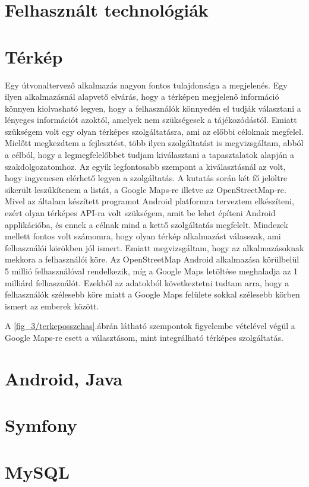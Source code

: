 	

\section{Felhasznált technológiák}
\label{felhaszntech}
\section*{Térkép}
Egy útvonaltervező alkalmazás nagyon fontos tulajdonsága a megjelenés. 
Egy ilyen alkalmazásnál alapvető elvárás, hogy a térképen megjelenő információ könnyen kiolvasható legyen, hogy a felhasználók könnyedén el tudják választani a lényeges információt azoktól, amelyek nem szükségesek a tájékozódástól. 
Emiatt szükségem volt egy olyan térképes szolgáltatásra, ami az előbbi céloknak megfelel. 
Mielőtt megkezdtem a fejlesztést, több ilyen szolgáltatást is megvizsgáltam, abból a célból, hogy a legmegfelelőbbet tudjam kiválasztani a tapasztalatok alapján a szakdolgozatomhoz. 
Az egyik legfontosabb szempont a kiválasztásnál az volt, hogy ingyenesen elérhető legyen a szolgáltatás. 
A kutatás során két fő jelöltre sikerült leszűkítenem a listát, a Google Maps-re illetve az OpenStreetMap-re. 
Mivel az általam készített programot Android platformra terveztem elkészíteni, ezért olyan térképes API-ra volt szükségem, amit be lehet építeni Android applikációba, és ennek a célnak mind a kettő szolgáltatás megfelelt. 
Mindezek mellett fontos volt számomra, hogy olyan térkép alkalmazást válasszak, ami felhasználói körökben jól ismert. 
Emiatt megvizsgáltam, hogy az alkalmazásoknak mekkora a felhasználói köre. 
Az OpenStreetMap Android alkalmazása körülbelül 5 millió  felhasználóval rendelkezik, míg a Google Maps letöltése meghaladja az 1 milliárd felhasználót. 
Ezekből az adatokból következtetni tudtam arra, hogy a felhasználók szélesebb köre miatt a Google Maps felülete sokkal szélesebb körben ismert az emberek között.


A \ref{fig_3/terkeposszehas}.ábrán látható szempontok figyelembe vételével végül a Google Maps-re esett a választásom, mint integrálható térképes szolgáltatás.

\section*{Android, Java}

\section*{Symfony}
\section*{MySQL}















